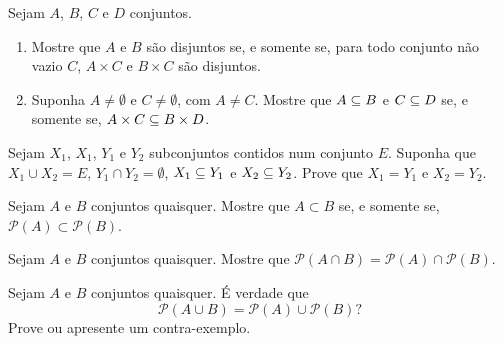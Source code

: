 \documentclass[12pt]{exam}
\begin{document}
    \vspace{.3cm}

    \questao{} Sejam $A$, $B$, $C$ e $D$ conjuntos.
    \begin{enumerate}[label={\alph*})]
        \item Mostre que $A$ e $B$ s\~ao disjuntos se, e somente se, para todo conjunto n\~ao vazio $C$, $A \times C$ e $B \times C$ s\~ao disjuntos.

        \item Suponha $A \ne \emptyset$ e $C \ne \emptyset$, com $A \ne C$. Mostre que $A \subseteq B$ e $C \subseteq D$ se, e somente se, $A \times C \subseteq B \times D$.
    \end{enumerate}

    \vspace{.3cm}

    \questao{} Sejam $X_1$, $X_1$, $Y_1$ e $Y_2$ subconjuntos contidos num conjunto $E$. Suponha que $X_1 \cup X_2 = E$, $Y_1 \cap Y_2 = \emptyset$, $X_1 \subseteq Y_1$ e $X_2 \subseteq Y_2$. Prove que $X_1 = Y_1$ e $X_2 = Y_2$.

    \vspace{.3cm}

    \questao{} Sejam $A$ e $B$ conjuntos quaisquer. Mostre que $A \subset B$ se, e somente se, $\mathcal{P}(A) \subset \mathcal{P}(B)$.

    \vspace{.3cm}

    \questao{} Sejam $A$ e $B$ conjuntos quaisquer. Mostre que $\mathcal{P}(A \cap B) = \mathcal{P}(A) \cap \mathcal{P}(B)$.

    \vspace{.3cm}

    \questao{} Sejam $A$ e $B$ conjuntos quaisquer. É verdade que
    \[
       \mathcal{P}(A \cup B) = \mathcal{P}(A) \cup \mathcal{P}(B)?
    \]
    Prove ou apresente um contra-exemplo.
\end{document}
